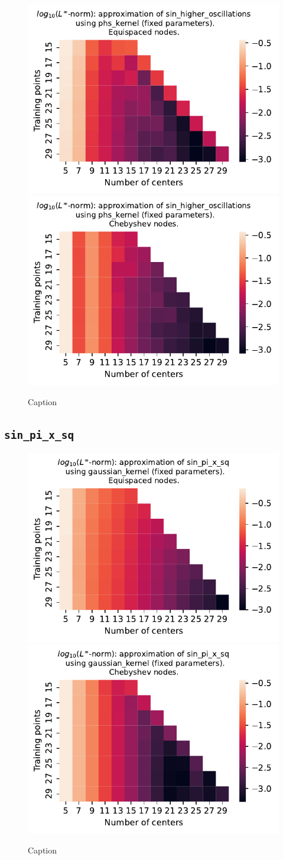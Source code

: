 \documentclass[12pt]{report} %
\begin{document}
\begin{figure}[ht]
    \centering
    
    \includegraphics[width=.49\textwidth]{imagenes/experiments/1d/least_squares/opt-sin_higher_oscillations-Kphs_kernel-Equi.pdf}
    \includegraphics[width=.49\textwidth]{imagenes/experiments/1d/least_squares/opt-sin_higher_oscillations-Kphs_kernel-Cheb.pdf}
    \caption{Caption}
    \label{fig:opt-sin-higher-oscillations-phs}
\end{figure}

\subsection*{\texttt{sin\_pi\_x\_sq}}

\begin{figure}[ht]
    \centering
    
    \includegraphics[width=.49\textwidth]{imagenes/experiments/1d/least_squares/opt-sin_pi_x_sq-Kgaussian_kernel-Equi.pdf}
    \includegraphics[width=.49\textwidth]{imagenes/experiments/1d/least_squares/opt-sin_pi_x_sq-Kgaussian_kernel-Cheb.pdf}
    \caption{Caption}
    \label{fig:opt-sin-pi-x-sq-gaussian}
\end{figure}
\end{document}
